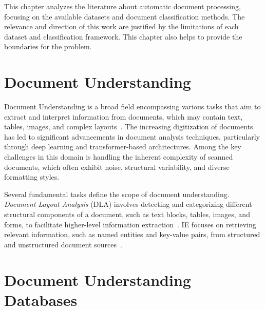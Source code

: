 This chapter analyzes the literature about automatic document processing, focusing on the available datasets and document classification methods. The relevance and direction of this work are justified by the limitations of each dataset and classification framework. This chapter also helps to provide the boundaries for the problem.

\section{Document Understanding}

Document Understanding is a broad field encompassing various tasks that aim to extract and interpret information from documents, which may contain text, tables, images, and complex layouts~\cite{formUnderstandingSurvey}. The increasing digitization of documents has led to significant advancements in document analysis techniques, particularly through deep learning and transformer-based architectures. Among the key challenges in this domain is handling the inherent complexity of scanned documents, which often exhibit noise, structural variability, and diverse formatting styles.

Several fundamental tasks define the scope of document understanding. \textit{Document Layout Analysis} (DLA) involves detecting and categorizing different structural components of a document, such as text blocks, tables, images, and forms, to facilitate higher-level information extraction~\cite{zhong2019publaynet}. \gls{IE} focuses on retrieving relevant information, such as named entities and key-value pairs, from structured and unstructured document sources~\cite{formUnderstandingSurvey}. 


\section{Document Understanding Databases}

